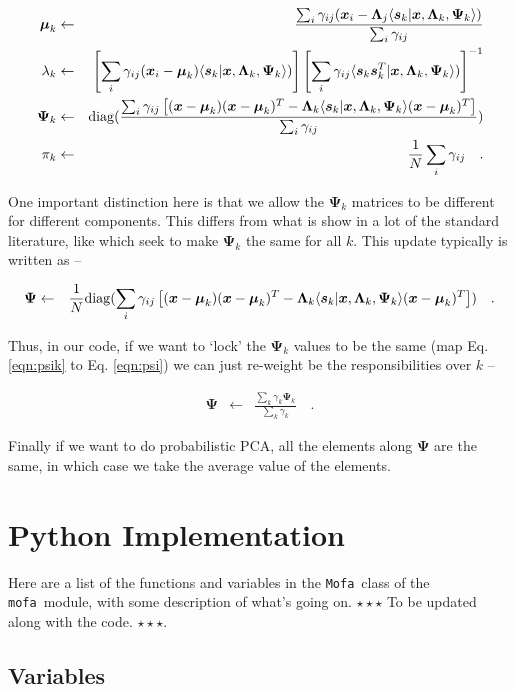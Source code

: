 \documentclass[letterpaper,12pt]{article}
\newcommand{\mofa}{\texttt{mofa}}
\newcommand{\Mofa}{\texttt{Mofa}}
\newcommand{\vect}[1]{\boldsymbol{#1}}
\newcommand{\data}{\vect{x}}
\newcommand{\latent}{\vect{s}}
\newcommand{\mean}{\vect{\mu}}
\newcommand{\lmda}{\vect{\Lambda}}
\newcommand{\ps}{\vect{\Psi}}
\begin{document}
\begin{eqnarray}\displaystyle
\mean_k &\leftarrow& \frac{\sum_i\gamma_{ij}(\data_i-{\lmda_j \langle\latent_k|\data,\lmda_k,\ps_k\rangle})}{\sum_i\gamma_{ij}} \\
\lambda_k &\leftarrow& \left[ \sum_i\gamma_{ij}(\data_i- \mean_k)\langle\latent_k|\data,\lmda_k,\ps_k\rangle) \right]  \left[ \sum_i\gamma_{ij}\langle\latent_k\latent_k^T|\data,\lmda_k,\ps_k\rangle) \right]^{-1}\\
\label{eqn:psik}
\ps_k &\leftarrow& {\rm diag}(\frac{\sum_i\gamma_{ij}\left[(\data-\mean_k)(\data-\mean_k)^T-\lmda_k \langle\latent_k|\data,\lmda_k,\ps_k\rangle(\data-\mean_k)^T\right]}{\sum_i\gamma_{ij}}) \\
\pi_k &\leftarrow& \frac{1}{N}\sum_i\gamma_{ij}
\quad .
\end{eqnarray}

One important distinction here is that we allow the $\ps_k$ matrices to be different for 
different components.  This differs from what is show in a lot of the standard literature, 
like \citet{ghahramani96} which seek to make $\ps_k$ the same for all $k$.  This update 
typically is written as --

\begin{eqnarray}\displaystyle
\label{eqn:psi}
\ps &\leftarrow& \frac{1}{N}{\rm diag}(\sum_i\gamma_{ij}\left[(\data-\mean_k)(\data-\mean_k)^T-\lmda_k \langle\latent_k|\data,\lmda_k,\ps_k\rangle(\data-\mean_k)^T\right]) 
\quad .
\end{eqnarray}

Thus, in our code, if we want to `lock' the $\ps_k$ values to be the same (map Eq. 
\ref{eqn:psik} to Eq. \ref{eqn:psi}) we can just re-weight be the responsibilities 
over $k$ --

\begin{eqnarray}\displaystyle
\ps &\leftarrow& \frac{\sum_k \gamma_k \ps_k}{\sum_k \gamma_k } 
\quad .
\end{eqnarray}

Finally if we want to do probabilistic PCA, all the elements along $\ps$ are the same, 
in which case we take the average value of the elements.

\section{Python Implementation}

Here are a list of the functions and variables in the \Mofa\ class of
the \mofa\ module, with some description of what's going on.
$\star\star\star$ To be updated along with the
code. $\star\star\star$.

\subsection{Variables}

\texttt{}
\end{document}
